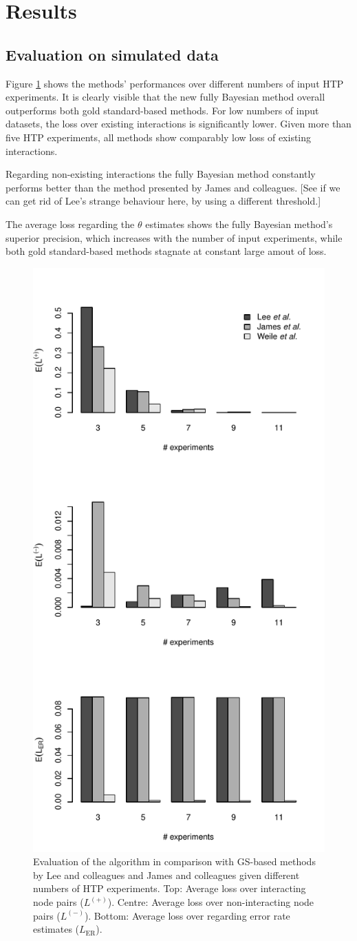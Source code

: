 \documentclass{bioinfo}
\newcommand{\note}[1]{{\color{red}[#1]}}
\begin{document}
\section{Results}

\subsection{Evaluation on simulated data}

Figure \ref{htp} shows the methods' performances over different numbers of input HTP experiments. It is clearly visible that the new fully Bayesian method overall outperforms both gold standard-based methods. For low numbers of input datasets, the loss over existing interactions is significantly lower. Given more than five HTP experiments, all methods show comparably low loss of existing interactions. 

Regarding non-existing interactions the fully Bayesian method constantly performs better than the method presented by James and colleagues. \note{See if we can get rid of Lee's strange behaviour here, by using a different threshold.}

The average loss regarding the $\theta$ estimates shows the fully Bayesian method's superior precision, which increases with the number of input experiments, while both gold standard-based methods stagnate at constant large amout of loss.

\begin{figure}[!tpb]
\centerline{\includegraphics[width=.5\textwidth]{fig1.pdf}}
\caption{Evaluation of the algorithm in comparison with GS-based methods by Lee and colleagues and James and colleagues given different numbers of HTP experiments. Top: Average loss over interacting node pairs ($L^{(+)}$). Centre: Average loss over non-interacting node pairs ($L^{(-)}$). Bottom: Average loss over regarding error rate estimates ($L_\text{ER}$).}
\label{htp}
\end{figure}
\end{document}
